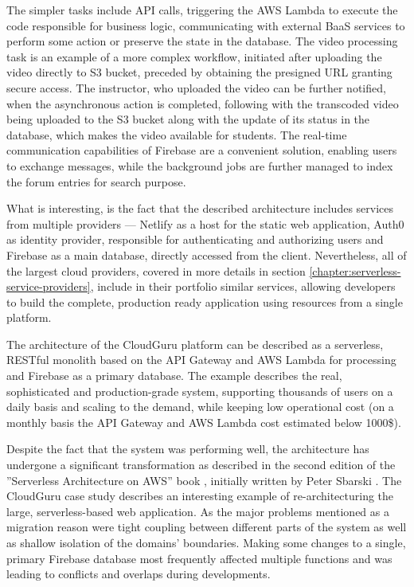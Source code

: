 The simpler tasks include API calls, triggering the AWS Lambda to execute the code responsible for business logic, communicating with external BaaS services to perform some action or preserve the state in the database.
The video processing task is an example of a more complex workflow, initiated after uploading the video directly to S3 bucket, preceded by obtaining the presigned URL granting secure access.
The instructor, who uploaded the video can be further notified, when the asynchronous action is completed, following with the transcoded video being uploaded to the S3 bucket along with the update of its status in the database, which makes the video available for students.
The real-time communication capabilities of Firebase are a convenient solution, enabling users to exchange messages, while the background jobs are further managed to index the forum entries for search purpose.

What is interesting, is the fact that the described architecture includes services from multiple providers --- Netlify as a host for the static web application, Auth0 as identity provider, responsible for authenticating and authorizing users and Firebase as a main database, directly accessed from the client. Nevertheless, all of the largest cloud providers, covered in more details in section \ref{chapter:serverless-service-providers}, include in their portfolio similar services, allowing developers to build the complete, production ready application using resources from a single platform.

The architecture of the CloudGuru platform can be described as a serverless, RESTful monolith based on the API Gateway and AWS Lambda for processing and Firebase as a primary database.
The example describes the real, sophisticated and production-grade system, supporting thousands of users on a daily basis and scaling to the demand, while keeping low operational cost (on a monthly basis the API Gateway and AWS Lambda cost estimated below 1000\$).

Despite the fact that the system was performing well, the architecture has undergone a significant transformation as described in the second edition of the ''Serverless Architecture on AWS'' book \cite{ServerlessArchitectureOnAWSSecondEdition}, initially written by Peter Sbarski \cite{ServerlessArchitectureOnAWS}.
The CloudGuru case study describes an interesting example of re-architecturing the large, serverless-based web application.
As the major problems mentioned as a migration reason were tight coupling between different parts of the system as well as shallow isolation of the domains' boundaries.
Making some changes to a single, primary Firebase database most frequently affected multiple functions and was leading to conflicts and overlaps during developments.

